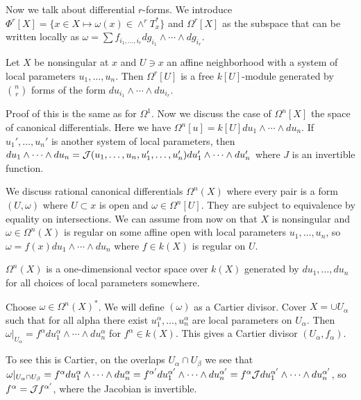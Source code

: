 \documentclass[twoside, 10pt]{article}
\begin{document}
        Now we talk about differential $r$-forms. We introduce $\Phi^r[X] = \{
        x \in X \mapsto \omega(x) \in \land^r T_x^*\}$ and $\Omega^r[X]$ as the
        subspace that can be written locally as $\omega = \sum f_{i_1, \ldots,
        i_r} dg_{i_1} \land \cdots \land dg_{i_r}$.

        \begin{thm} Let $X$ be nonsingular at $x$ and $U \ni x$ an affine
            neighborhood with a system of local parameters $u_1, \ldots, u_n$.
            Then $\Omega^r[U]$ is a free $k[U]$-module generated by
            $\binom{n}{r}$ forms of the form $du_{i_1} \land \cdots \land
            du_{i_r}$.  \end{thm}

        Proof of this is the same as for $\Omega^1$. Now we discuss the case of
        $\Omega^n[X]$ the space of canonical differentials. Here we have
        $\Omega^n[u] = k[U] du_1 \land \cdots \land du_n$. If $u_1', \ldots,
        u_n'$ is another system of local parameters, then $du_1 \land \cdots
        \land du_n = \mathcal{J}(u_1, \ldots, u_n, u_1', \ldots, u_n') du_1' \land
        \cdots \land du_n'$ where $J$ is an invertible function.

        We discuss rational canonical differentials $\Omega^n(X)$ where every
        pair is a form $(U,\omega)$ where $U \subset x$ is open and $\omega \in
        \Omega^n[U]$. They are subject to equivalence by equality on
        intersections. We can assume from now on that $X$ is nonsingular and
        $\omega \in \Omega^n(X)$ is regular on some affine open with local
        parameters $u_1, \ldots, u_n$, so $\omega = f(x) du_1 \land \cdots
        \land du_n$ where $f \in k(X)$ is regular on $U$.

        \begin{lem} $\Omega^n(X)$ is a one-dimensional vector space over $k(X)$
        generated by $du_1, \ldots, du_n$ for all choices of local parameters
    somewhere.  \end{lem}

        \begin{defn} Choose $\omega \in \Omega^n(X)^*$. We will define
            $(\omega)$ as a Cartier divisor. Cover $X = \cup U_{\alpha}$ such
            that for all alpha there exist $u_1^{\alpha}, \ldots, u_n^{\alpha}$
            are local parameters on $U_{\alpha}$. Then $\omega|_{U_{\alpha}} =
            f^{\alpha} du_1^{\alpha} \land \cdots \land du_n^{\alpha}$ for
            $f^{\alpha} \in k(X)$. This gives a Cartier divisor $(U_{\alpha},
            f_{\alpha})$. 
            
            To see this is Cartier, on the overlaps $U_{\alpha} \cap U_{\beta}$
            we see that $\omega|_{U_{\alpha} \cap U_{\beta}} = f^{\alpha}
            du_1^{\alpha} \land \cdots \land du_n^{\alpha} = f^{\alpha'}
            du_1^{\alpha'} \land \cdots \land du_n^{\alpha'} = f^{\alpha}
        \mathcal{J} du_1^{\alpha'} \land \cdots \land du_n^{\alpha'}$, so
    $f^{\alpha} = \mathcal{J} f^{\alpha'}$, where the Jacobian is invertible.
\end{defn}
\end{document}
